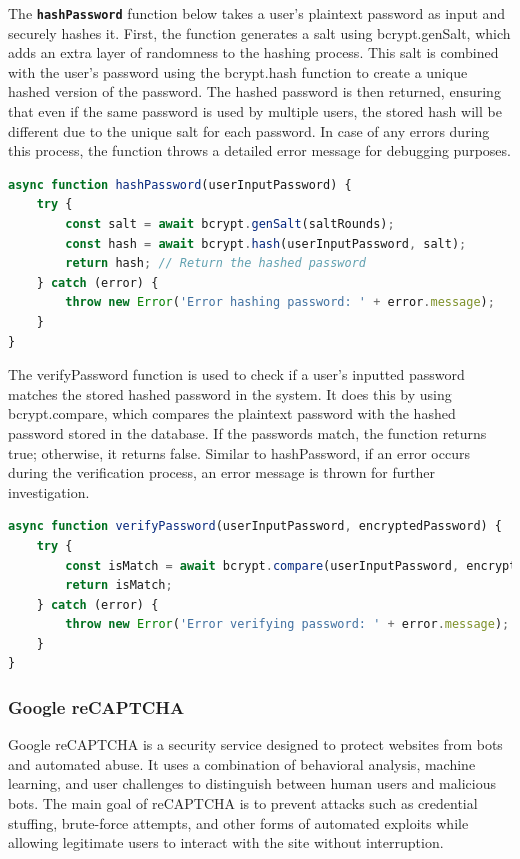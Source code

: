 	The \texttt{\textbf{hashPassword}} function below takes a user's plaintext password as input and securely hashes it. First, the function generates a salt using bcrypt.genSalt, which adds an extra layer of randomness to the hashing process. This salt is combined with the user's password using the bcrypt.hash function to create a unique hashed version of the password. The hashed password is then returned, ensuring that even if the same password is used by multiple users, the stored hash will be different due to the unique salt for each password. In case of any errors during this process, the function throws a detailed error message for debugging purposes.
	
\begin{lstlisting}[language=Javascript, breaklines=true, caption=Password Hashing]
async function hashPassword(userInputPassword) {
	try {
		const salt = await bcrypt.genSalt(saltRounds);
		const hash = await bcrypt.hash(userInputPassword, salt);
		return hash; // Return the hashed password
	} catch (error) {
		throw new Error('Error hashing password: ' + error.message);
	}
}
\end{lstlisting}

	The verifyPassword function is used to check if a user's inputted password matches the stored hashed password in the system. It does this by using bcrypt.compare, which compares the plaintext password with the hashed password stored in the database. If the passwords match, the function returns true; otherwise, it returns false. Similar to hashPassword, if an error occurs during the verification process, an error message is thrown for further investigation.
	
\begin{lstlisting}[language=Javascript, breaklines=true, caption=Password Verification]
async function verifyPassword(userInputPassword, encryptedPassword) {
	try {
		const isMatch = await bcrypt.compare(userInputPassword, encryptedPassword);
		return isMatch;
	} catch (error) {
		throw new Error('Error verifying password: ' + error.message);
	}
}
\end{lstlisting}
	
	
	
	\subsubsection{Google reCAPTCHA}
	Google reCAPTCHA is a security service designed to protect websites from bots and automated abuse. It uses a combination of behavioral analysis, machine learning, and user challenges to distinguish between human users and malicious bots. The main goal of reCAPTCHA is to prevent attacks such as credential stuffing, brute-force attempts, and other forms of automated exploits while allowing legitimate users to interact with the site without interruption. \cite{google-recaptcha}
	
